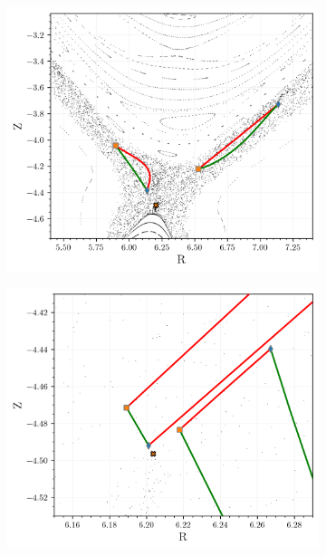 \begin{figure}[H]
\begin{minipage}[c]{0.42\textwidth}
\begin{subfigure}[b]{0.95\textwidth}
            \includegraphics[width=\textwidth]{images/turnstile/coutour_c1.png}
            \caption{}
            \label{fig:flux-poincare-conv-b}
        \end{subfigure}
        \vfill
        \vspace{10px}
        \vfill
        \begin{subfigure}[b]{0.95\textwidth}
            \centering
            \includegraphics[width=\textwidth]{images/turnstile/coutour_c2.png}
            \caption{}
            \label{fig:flux-poincare-conv-c}

\end{subfigure}
\end{minipage}
\end{figure}
